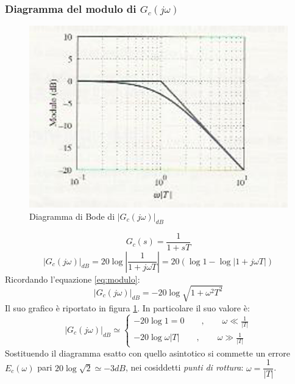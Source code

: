 \documentclass[a4paper]{report}
\begin{document}
\subsubsection{Diagramma del modulo di $G_c(j\omega)$}
\begin{figure}[!t]
  \begin{center}
    \includegraphics[scale=0.5]{./figures/diagmod3.png}
    \caption{Diagramma di Bode di $|G_c(j\omega)|_{dB}$}
    \label{fig:bode3}
  \end{center}
\end{figure} 
\[
  G_c(s)=\frac{1}{1+sT}
\]
\begin{displaymath}
  |G_c(j\omega)|_{dB} = 20\log\left | \dfrac{1}{1 + j\omega T}\right |
  = 20 ( \log 1 - \log | 1 + j \omega T |)
\end{displaymath}
Ricordando l'equazione \ref{eq:modulo}:
\[
  |G_c(j\omega)|_{dB} = - 20\log \sqrt {1 + \omega^2T^2}
\]
Il suo grafico \`e riportato in figura \ref{fig:bode3}. In particolare
il suo valore \`e:
\begin{displaymath}
  |G_c(j\omega)|_{dB}\simeq \left\{ 
  \begin{array}{l}
    -20\log 1 = 0\qquad,\qquad \omega \ll \frac{1}{|T|} \\ 
    -20\log \omega |T| \qquad , \qquad \omega \gg \frac{1}{|T|}
  \end{array}
  \right.
\end{displaymath}
Sostituendo il diagramma esatto con quello asintotico si commette un
errore $E_c(\omega)$ pari $20\log\sqrt{2} \simeq -3dB$, nei cosiddetti
\emph{punti di rottura}: $\omega =
\dfrac{1}{|T|}$. 
\end{document}
